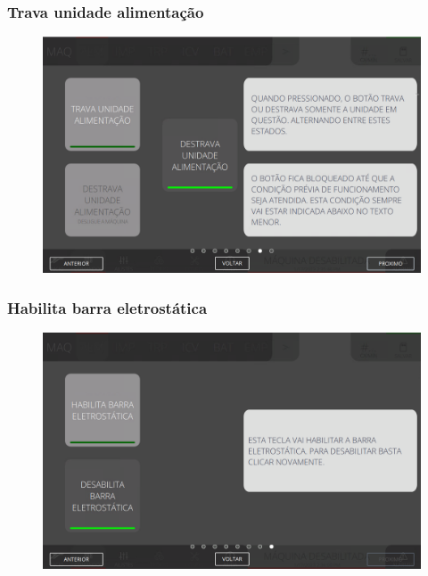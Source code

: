 \newpage
\thispagestyle{fancy}
\vspace*{40 pt}
\subsubsection{\small{Trava unidade alimentação}} \label{sec:telaComandoAlimentacaoTravaUnidadeAlimentacao}
\vspace*{\fill}
\begin{figure}[h]
    \centering
    \includegraphics[width=576 px,height=360 px]{src/imagesICV/03-feeder/commands/8.png}
\end{figure}
\vspace*{\fill}

\newpage
\thispagestyle{fancy}
\vspace*{40 pt}
\subsubsection{\small{Habilita barra eletrostática}} \label{sec:telaComandoAlimentacaoHabilitaBarraEletrosttica}
\vspace*{\fill}
\begin{figure}[h]
    \centering
    \includegraphics[width=576 px,height=360 px]{src/imagesICV/03-feeder/commands/9.png}
\end{figure}
\vspace*{\fill}